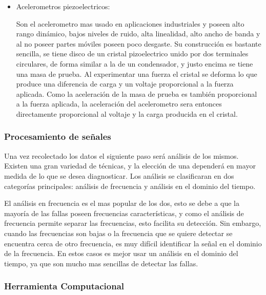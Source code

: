 \begin{itemize}
\item Acelerometros piezoelectricos:

Son el acelerometro mas usado en aplicaciones industriales y poseen alto rango
dinámico, bajos niveles de ruido, alta linealidad, alto ancho de banda y al no
poseer partes móviles poseen poco desgaste. Su construcción es bastante
sencilla, se tiene disco de un cristal pizoelectrico unido por dos terminales
circulares, de forma similar a la de un condensador, y justo encima se tiene
una masa de prueba. Al experimentar una fuerza el cristal se deforma lo que
produce una diferencia de carga y un voltaje proporcional a la fuerza aplicada.
Como la aceleración de la masa de prueba es también proporcional a la fuerza
aplicada, la aceleración del acelerometro sera entonces directamente
proporcional al voltaje y la carga producida en el cristal.


\end{itemize}




\subsubsection{Procesamiento de señales}

Una vez recolectado los datos el siguiente paso será análisis de los mismos.
Existen una gran variedad de técnicas, y la elección de una dependerá en mayor
medida de lo que se desea diagnosticar. Los análisis se clasificaran en dos
categorías principales: análisis de frecuencia y análisis en el dominio del
tiempo.

El análisis en frecuencia es el mas popular de los dos, esto se debe a
que la mayoría de las fallas poseen frecuencias características, y como el
análisis de frecuencia permite separar las frecuencias, esto facilita su
detección. Sin embargo, cuando las frecuencias son bajas o la frecuencia que se
quiere detectar se encuentra cerca de otro frecuencia, es muy difícil
identificar la señal en el dominio de la frecuencia. En estos casos es mejor
usar un análisis en el dominio del tiempo, ya que son mucho mas sencillas de
detectar las fallas.



\subsubsection{Herramienta Computacional}












